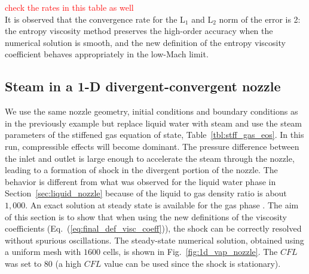 \documentclass[preprint,10pt]{elsarticle}
\newcommand{\eqt}[1]{Eq.~(\ref{#1})}                     %
\newcommand{\fig}[1]{Fig.~\ref{#1}}                      %
\newcommand{\tbl}[1]{Table~\ref{#1}}                     %
\newcommand{\sct}[1]{Section~\ref{#1}}                   %
\newcommand{\tcr}[1]{\textcolor{red}{#1}}
\begin{document}
\tcr{check the rates in this table as well\\}
It is observed that the convergence rate for the L$_1$ and L$_2$ norm of the error is 2: the entropy viscosity method preserves the high-order accuracy when the numerical solution is smooth, and the new definition of the entropy viscosity coefficient behaves appropriately in the low-Mach limit.

\subsection{Steam in a 1-D divergent-convergent nozzle} \label{sec:steam_nozzle}

We use the same nozzle geometry, initial conditions and boundary conditions as in the previously example but replace liquid water with steam and use the steam parameters of the stiffened gas equation of state, \tbl{tbl:stff_gas_eos}. In this run, compressible effects will become dominant. 
The pressure difference between the inlet and outlet is large enough to accelerate the steam through the nozzle, leading to a formation of shock in the divergent portion of the nozzle. The behavior is different from what was observed for the liquid water phase in \sct{sec:liquid_nozzle} because of the liquid to gas density ratio is about $1,000$. An exact solution at steady state is available for the gas phase \cite{nozzle_exact}. The aim of this section is to show that when using the new definitions of the viscosity coefficients (\eqt{eq:final_def_visc_coeff}), the shock can be correctly resolved without spurious oscillations. The steady-state numerical solution, obtained using a uniform mesh with $1600$ cells, is shown in \fig{fig:1d_vap_nozzle}. The $CFL$ was set to $80$ (a high $CFL$ value can be used since the shock is stationary).
\end{document}
